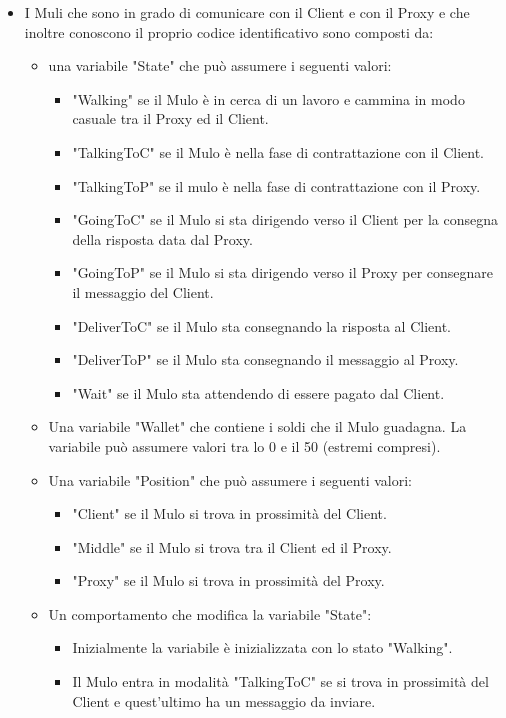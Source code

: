 \documentclass[13pt,a4paper]{article}
\begin{document}
\begin{itemize}
		
		\item I Muli che sono in grado di comunicare con il Client e con il Proxy e che  inoltre conoscono il proprio codice identificativo sono composti da:
		\begin{itemize}
			\item una variabile "State" che può assumere i seguenti valori:
			\begin{itemize}
				\item "Walking" se il Mulo è in cerca di un lavoro e cammina in modo casuale tra il Proxy ed il Client.
				\item "TalkingToC" se il Mulo è nella fase di contrattazione con il Client.
				\item "TalkingToP" se il mulo è nella fase di contrattazione con il Proxy.
				\item "GoingToC" se il Mulo si sta dirigendo verso il Client per la consegna della risposta data dal Proxy.
				\item "GoingToP" se il Mulo si sta dirigendo verso il Proxy per consegnare il messaggio del Client.
				\item "DeliverToC" se il Mulo sta consegnando la risposta al Client.
				\item "DeliverToP" se il Mulo sta consegnando il messaggio al Proxy.
				\item "Wait" se il Mulo sta attendendo di essere pagato dal Client.
			\end{itemize}
			\item Una variabile "Wallet" che contiene i soldi che il Mulo guadagna.  La variabile può assumere valori tra lo 0 e il 50 (estremi compresi).
			\item Una variabile "Position" che può assumere i seguenti valori:
			\begin{itemize}
				\item "Client" se il Mulo si trova in prossimità del Client.
				\item "Middle" se il Mulo si trova tra il Client ed il Proxy.
				\item "Proxy" se il Mulo si trova in prossimità del Proxy.
			\end{itemize}
			\item Un comportamento che modifica la variabile "State":
			\begin{itemize}
				\item Inizialmente la variabile è inizializzata con lo stato "Walking".
				\item Il Mulo entra in modalità "TalkingToC" se si trova in prossimità del Client e quest'ultimo ha un messaggio da inviare.

\end{itemize}
\end{itemize}
\end{itemize}
\end{document}
